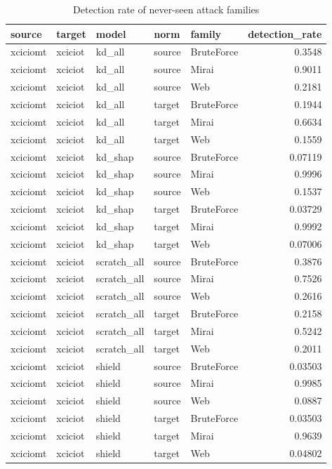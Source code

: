 \begin{table}
\caption{Detection rate of never-seen attack families}
\begin{tabular}{lllllr}
\toprule
source & target & model & norm & family & detection_rate \\
\midrule
xciciomt & xciciot & kd_all & source & BruteForce & 0.3548 \\
xciciomt & xciciot & kd_all & source & Mirai & 0.9011 \\
xciciomt & xciciot & kd_all & source & Web & 0.2181 \\
xciciomt & xciciot & kd_all & target & BruteForce & 0.1944 \\
xciciomt & xciciot & kd_all & target & Mirai & 0.6634 \\
xciciomt & xciciot & kd_all & target & Web & 0.1559 \\
xciciomt & xciciot & kd_shap & source & BruteForce & 0.07119 \\
xciciomt & xciciot & kd_shap & source & Mirai & 0.9996 \\
xciciomt & xciciot & kd_shap & source & Web & 0.1537 \\
xciciomt & xciciot & kd_shap & target & BruteForce & 0.03729 \\
xciciomt & xciciot & kd_shap & target & Mirai & 0.9992 \\
xciciomt & xciciot & kd_shap & target & Web & 0.07006 \\
xciciomt & xciciot & scratch_all & source & BruteForce & 0.3876 \\
xciciomt & xciciot & scratch_all & source & Mirai & 0.7526 \\
xciciomt & xciciot & scratch_all & source & Web & 0.2616 \\
xciciomt & xciciot & scratch_all & target & BruteForce & 0.2158 \\
xciciomt & xciciot & scratch_all & target & Mirai & 0.5242 \\
xciciomt & xciciot & scratch_all & target & Web & 0.2011 \\
xciciomt & xciciot & shield & source & BruteForce & 0.03503 \\
xciciomt & xciciot & shield & source & Mirai & 0.9985 \\
xciciomt & xciciot & shield & source & Web & 0.0887 \\
xciciomt & xciciot & shield & target & BruteForce & 0.03503 \\
xciciomt & xciciot & shield & target & Mirai & 0.9639 \\
xciciomt & xciciot & shield & target & Web & 0.04802 \\

\end{tabular}
\end{table}
